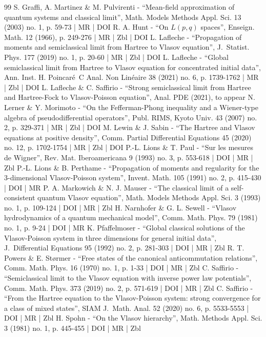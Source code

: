 \begin{thebibliography}{99}
S. Graffi, A. Martinez \& M. Pulvirenti - “Mean-field approximation of quantum systems and classical limit”, Math. Models Methods Appl. Sci. 13 (2003) no. 1, p. 59-73 | MR | DOI
R. A. Hunt - “On $L(p,q)$ spaces”, Enseign. Math. 12 (1966), p. 249-276 | MR | Zbl | DOI
L. Lafleche - “Propagation of moments and semiclassical limit from Hartree to Vlasov equation”, J. Statist. Phys. 177 (2019) no. 1, p. 20-60 | MR | Zbl | DOI
L. Lafleche - “Global semiclassical limit from Hartree to Vlasov equation for concentrated initial data”, Ann. Inst. H. Poincaré C Anal. Non Linéaire 38 (2021) no. 6, p. 1739-1762 | MR | Zbl | DOI
L. Lafleche \& C. Saffirio - “Strong semiclassical limit from Hartree and Hartree-Fock to Vlasov-Poisson equation”, Anal. PDE (2021), to appear
N. Lerner \& Y. Morimoto - “On the Fefferman-Phong inequality and a Wiener-type algebra of pseudodifferential operators”, Publ. RIMS, Kyoto Univ. 43 (2007) no. 2, p. 329-371 | MR | Zbl | DOI
M. Lewin \& J. Sabin - “The Hartree and Vlasov equations at positive density”, Comm. Partial Differential Equations 45 (2020) no. 12, p. 1702-1754 | MR | Zbl | DOI
P.-L. Lions \& T. Paul - “Sur les mesures de Wigner”, Rev. Mat. Iberoamericana 9 (1993) no. 3, p. 553-618 | DOI | MR | Zbl
P.-L. Lions \& B. Perthame - “Propagation of moments and regularity for the 3-dimensional Vlasov-Poisson system”, Invent. Math. 105 (1991) no. 2, p. 415-430 | DOI | MR
P. A. Markowich \& N. J. Mauser - “The classical limit of a self-consistent quantum Vlasov equation”, Math. Models Methods Appl. Sci. 3 (1993) no. 1, p. 109-124 | DOI | MR | Zbl
H. Narnhofer \& G. L. Sewell - “Vlasov hydrodynamics of a quantum mechanical model”, Comm. Math. Phys. 79 (1981) no. 1, p. 9-24 | DOI | MR
K. Pfaffelmoser - “Global classical solutions of the Vlasov-Poisson system in three dimensions for general initial data”, J. Differential Equations 95 (1992) no. 2, p. 281-303 | DOI | MR | Zbl
R. T. Powers \& E. Størmer - “Free states of the canonical anticommutation relations”, Comm. Math. Phys. 16 (1970) no. 1, p. 1-33 | DOI | MR | Zbl
C. Saffirio - “Semiclassical limit to the Vlasov equation with inverse power law potentials”, Comm. Math. Phys. 373 (2019) no. 2, p. 571-619 | DOI | MR | Zbl
C. Saffirio - “From the Hartree equation to the Vlasov-Poisson system: strong convergence for a class of mixed states”, SIAM J. Math. Anal. 52 (2020) no. 6, p. 5533-5553 | DOI | MR | Zbl
H. Spohn - “On the Vlasov hierarchy”, Math. Methods Appl. Sci. 3 (1981) no. 1, p. 445-455 | DOI | MR | Zbl
\end{thebibliography}
